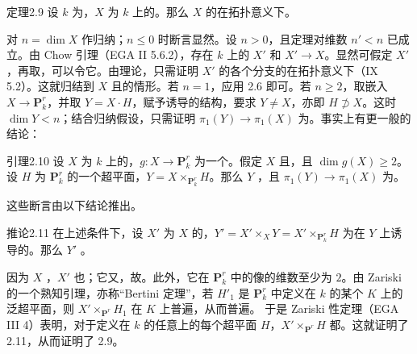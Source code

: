 \begin{SGAresult}{定理}{2.9}
设 $k$ 为，$X$ 为 $k$ 上的。那么 $X$ 的在拓扑意义下。
\end{SGAresult}
对 $n=\dim X$ 作归纳；$n\leq0$ 时断言显然。设 $n>0$，且定理对维数 $n'<n$ 已成立。由 Chow 引理（EGA II 5.6.2），存在 $k$ 上的 $X'$ 和 $X'\to X$。显然可假定 $X'$ ，再取，可以令它。由理论，只需证明 $X'$ 的各个分支的在拓扑意义下（IX 5.2）。这就归结到 $X$ 且的情形。若 $n=1$，应用 2.6 即可。若 $n\geq2$，取嵌入 $X\to\mathbf P^r_k$，并取 $Y=X\cdot H$，赋予诱导的结构，要求 $Y\ne X$，亦即 $H\not\supset X$。这时 $\dim Y<n$；结合归纳假设，只需证明 $\pi_1(Y)\to\pi_1(X)$ 为。事实上有更一般的结论：
\begin{SGAresult}{引理}{2.10}
设 $X$ 为 $k$ 上的，$g:X\to\mathbf P^r_k$ 为一个。假定 $X$ 且，且 $\dim g(X)\geq2$。设 $H$ 为 $\mathbf P^r_k$ 的一个超平面，$Y=X\times_{\mathbf P^r_k}H$。那么 $Y$ ，且 $\pi_1(Y)\to\pi_1(X)$ 为。
\end{SGAresult}
这些断言由以下结论推出。
\begin{SGAresult}{推论}{2.11}
在上述条件下，设 $X'$ 为 $X$ 的，$Y'=X'\times_X Y=X'\times_{\mathbf P^r_k}H$ 为在 $Y$ 上诱导的。那么 $Y'$ 。
\end{SGAresult}
因为 $X$ ，$X'$ 也；它又，故。此外，它在 $\mathbf P^r_k$ 中的像的维数至少为 $2$。由 Zariski 的一个熟知引理，亦称“Bertini 定理”，若 $H'_1$ 是 $\mathbf P^r_k$ 中定义在 $k$ 的某个 $K$ 上的泛超平面，则 $X'\times_{\mathbf P^r}H_1$ 在 $K$ 上普遍，从而普遍。
于是 Zariski 性定理（EGA III 4）表明，对于定义在 $k$ 的任意上的每个超平面 $H$，$X'\times_{\mathbf P^r}H$ 都。这就证明了 2.11，从而证明了 2.9。

